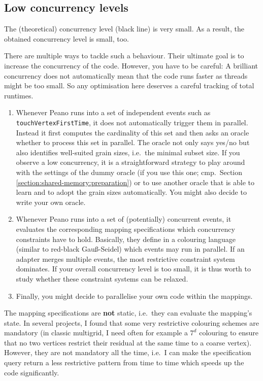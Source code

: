 
\subsection{Low concurrency levels}


\begin{smell}
 The (theoretical) concurrency level (black line) is very small. As a result,
 the obtained concurrency level is small, too.
\end{smell}

\noindent
There are multiple ways to tackle such a behaviour. Their ultimate goal is to
increase the concurrency of the code. However, you have to be careful: A
brilliant concurrency does not automatically mean that the code runs faster as
threads might be too small. So any optimisation here deserves a careful tracking
of total runtimes.

\begin{enumerate}
  \item Whenever Peano runs into a set of independent events such as
  \texttt{touchVertexFirstTime}, it does not automatically trigger them in
  parallel. Instead it first computes the cardinality of this set and then asks
  an oracle whether to process this set in parallel. The oracle not only says
  yes/no but also identifies well-suited grain sizes, i.e.~the minimal subset
  size. If you observe a low concurrency, it is a straightforward strategy to
  play around with the settings of the dummy oracle (if you use this one;
  cmp.~Section \ref{section:shared-memory:preparation}) or to use another oracle
  that is able to learn and to adopt the grain sizes automatically. You might also
  decide to write your own oracle.
  \item Whenever Peano runs into a set of (potentially) concurrent events, it
  evaluates the corresponding mapping specifications which concurrency
  constraints have to hold. Basically, they define in a colouring language
  (similar to red-black Gau\ss-Seidel) which events may run in parallel. If an
  adapter merges multiple events, the most restrictive constraint system
  dominates. If your overall concurrency level is too small, it is thus worth to
  study whether these constraint systems can be relaxed.
  \item Finally, you might decide to parallelise your own code within the
  mappings.
\end{enumerate}


\begin{remark}
  The mapping specifications are \textbf{not} static, i.e.~they can evaluate the
  mapping's state. In several projects, I found that some very restrictive
  colouring schemes are mandatory (in classic multigrid, I need often for
  example a $7^d$ colouring to ensure that no two vertices restrict their
  residual at the same time to a coarse vertex). However, they are not mandatory
  all the time, i.e.~I can make the specification query return a less
  restrictive pattern from time to time which speeds up the code significantly.
\end{remark}


